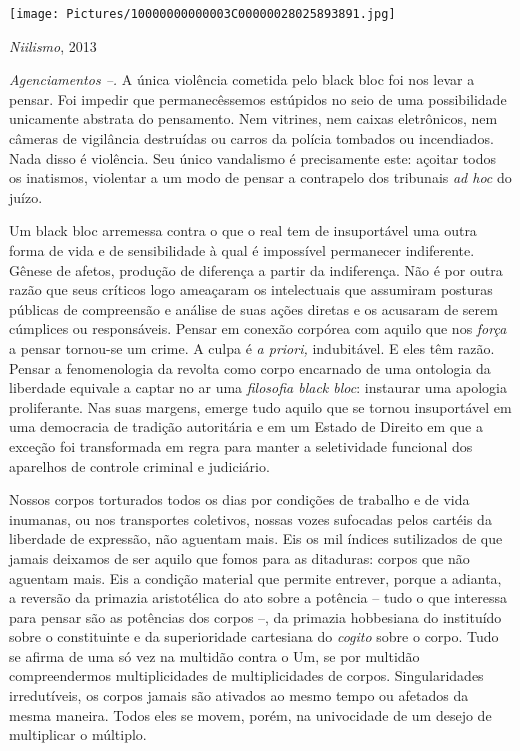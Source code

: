 \texttt{[image: Pictures/10000000000003C00000028025893891.jpg]}

\emph{Niilismo}, 2013

\emph{Agenciamentos --. }A única violência cometida pelo black bloc foi
nos levar a pensar. Foi impedir que permanecêssemos estúpidos no seio de
uma possibilidade unicamente abstrata do pensamento. Nem vitrines, nem
caixas eletrônicos, nem câmeras de vigilância destruídas ou carros da
polícia tombados ou incendiados. Nada disso é violência. Seu único
vandalismo é precisamente este: açoitar todos os inatismos, violentar a
um modo de pensar a contrapelo dos tribunais \emph{ad hoc} do juízo.

Um black bloc arremessa contra o que o real tem de insuportável uma
outra forma de vida e de sensibilidade à qual é impossível permanecer
indiferente. Gênese de afetos, produção de diferença a partir da
indiferença. Não é por outra razão que seus críticos logo ameaçaram os
intelectuais que assumiram posturas públicas de compreensão e análise de
suas ações diretas e os acusaram de serem cúmplices ou responsáveis.
Pensar em conexão corpórea com aquilo que nos \emph{força }a pensar
tornou-se um crime. A culpa é \emph{a priori, }indubitável. E eles têm
razão. Pensar a fenomenologia da revolta como corpo encarnado de uma
ontologia da liberdade equivale a captar no ar uma \emph{filosofia black
bloc}: instaurar uma apologia proliferante. Nas suas margens, emerge
tudo aquilo que se tornou insuportável em uma democracia de tradição
autoritária e em um Estado de Direito em que a exceção foi transformada
em regra para manter a seletividade funcional dos aparelhos de controle
criminal e judiciário.

Nossos corpos torturados todos os dias por condições de trabalho e de
vida inumanas, ou nos transportes coletivos, nossas vozes sufocadas
pelos cartéis da liberdade de expressão, não aguentam mais. Eis os mil
índices sutilizados de que jamais deixamos de ser aquilo que fomos para
as ditaduras: corpos que não aguentam mais. Eis a condição material que
permite entrever, porque a adianta, a reversão da primazia aristotélica
do ato sobre a potência -- tudo o que interessa para pensar são as
potências dos corpos --, da primazia hobbesiana do instituído sobre o
constituinte e da superioridade cartesiana do \emph{cogito }sobre o
corpo. Tudo se afirma de uma só vez na multidão contra o Um, se por
multidão compreendermos multiplicidades de multiplicidades de corpos.
Singularidades irredutíveis, os corpos jamais são ativados ao mesmo
tempo ou afetados da mesma maneira. Todos eles se movem, porém, na
univocidade de um desejo de multiplicar o múltiplo.

